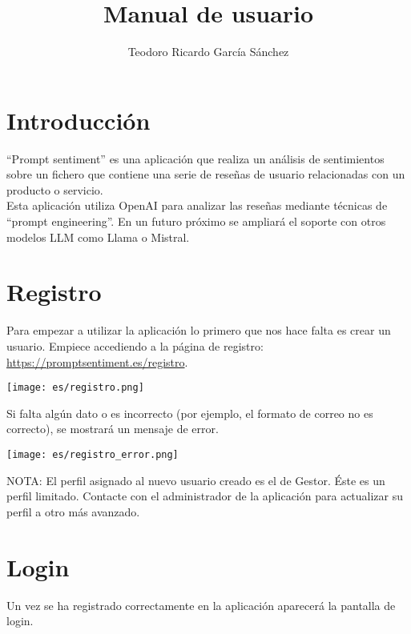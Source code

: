 \documentclass{ol-softwaremanual}
\title{Manual de usuario}
\author{Teodoro Ricardo García Sánchez}
\begin{document}
\maketitle

\tableofcontents

\newpage

\section{Introducción}

``Prompt sentiment'' es una aplicación que realiza un análisis de sentimientos sobre un 
fichero que contiene una serie de reseñas de usuario relacionadas con un producto o servicio.\\
Esta aplicación utiliza OpenAI para analizar las reseñas mediante técnicas de ``prompt engineering''.
En un futuro próximo se ampliará el soporte con otros modelos LLM como Llama o Mistral.

\newpage
\section{Registro}
Para empezar a utilizar la aplicación lo primero que nos hace falta es crear un usuario.
Empiece accediendo a la página de registro: \href{https://promptsentiment.es/registro}{https://promptsentiment.es/registro}.

\vspace{25pt}
\centerline{\texttt{[image: es/registro.png]}}
\vspace{25pt}

Si falta algún dato o es incorrecto (por ejemplo, el formato de correo no es correcto), se mostrará un mensaje de error.

\vspace{20pt}
\centerline{\texttt{[image: es/registro\_error.png]}}
\vspace{20pt}

NOTA: El perfil asignado al nuevo usuario creado es el de Gestor. Éste es un perfil limitado. Contacte con el administrador 
de la aplicación para actualizar su perfil a otro más avanzado.
\newpage
\section{Login}

Un vez se ha registrado correctamente en la aplicación aparecerá la pantalla de login.\\
\end{document}
